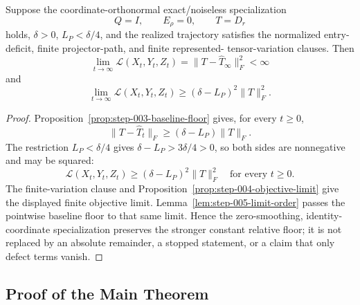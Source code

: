 \begin{proposition}
\label{prop:step-005-baseline-limit}
Suppose the coordinate-orthonormal exact/noiseless specialization
\[
Q=I,
\qquad E_\rho=0,
\qquad T=D_r
\]
holds, $\delta>0$, $L_P<\delta/4$, and the realized trajectory satisfies
the normalized entry-deficit, finite projector-path, and finite represented-
tensor-variation clauses.  Then
\[
\lim_{t\to\infty}\mathcal L(X_t,Y_t,Z_t)
=\|T-\widehat T_\infty\|_F^2<\infty
\]
and
\[
\lim_{t\to\infty}\mathcal L(X_t,Y_t,Z_t)
\geq(\delta-L_P)^2\|T\|_F^2.
\]
\end{proposition}

\begin{proof}
Proposition~\ref{prop:step-003-baseline-floor} gives, for every $t\geq0$,
\[
\|T-\widehat T_t\|_F\geq(\delta-L_P)\|T\|_F.
\]
The restriction $L_P<\delta/4$ gives
$\delta-L_P>3\delta/4>0$, so both sides are nonnegative and may be squared:
\[
\mathcal L(X_t,Y_t,Z_t)
\geq(\delta-L_P)^2\|T\|_F^2
\quad\text{for every }t\geq0.
\]
The finite-variation clause and
Proposition~\ref{prop:step-004-objective-limit} give the displayed finite
objective limit.  Lemma~\ref{lem:step-005-limit-order} passes the pointwise
baseline floor to that same limit.  Hence the zero-smoothing, identity-
coordinate specialization preserves the stronger constant relative floor;
it is not replaced by an absolute remainder, a stopped statement, or a claim
that only defect terms vanish.
\end{proof}

\subsection{Proof of the Main Theorem}\label{app:main-proof}

